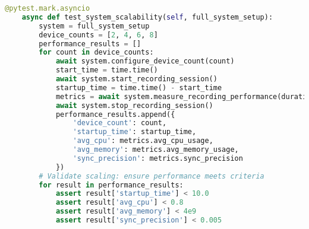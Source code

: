 \documentclass[11pt,a4paper]{report}
\begin{document}
\begin{lstlisting}[language=Python]
    @pytest.mark.asyncio
    async def test_system_scalability(self, full_system_setup):
        system = full_system_setup
        device_counts = [2, 4, 6, 8]
        performance_results = []
        for count in device_counts:
            await system.configure_device_count(count)
            start_time = time.time()
            await system.start_recording_session()
            startup_time = time.time() - start_time
            metrics = await system.measure_recording_performance(duration=30)
            await system.stop_recording_session()
            performance_results.append({
                'device_count': count,
                'startup_time': startup_time,
                'avg_cpu': metrics.avg_cpu_usage,
                'avg_memory': metrics.avg_memory_usage,
                'sync_precision': metrics.sync_precision
            })
        # Validate scaling: ensure performance meets criteria
        for result in performance_results:
            assert result['startup_time'] < 10.0
            assert result['avg_cpu'] < 0.8
            assert result['avg_memory'] < 4e9
            assert result['sync_precision'] < 0.005
\end{lstlisting}
\end{document}

